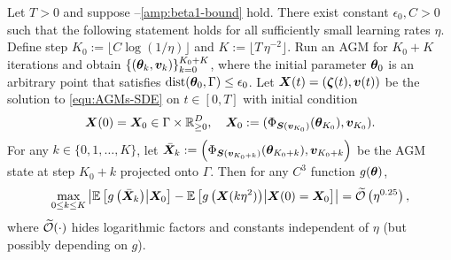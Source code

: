 
\begin{theorem}\label{thm:SDE-approximation}
Let $T>0$ and suppose --\ref{amp:beta1-bound} hold. 
There exist constant $\epsilon_0,C>0$ such that the following statement holds for all sufficiently small learning rates $\eta$.
Define step $K_0 := \lfloor C\log(1/\eta)\rfloor$ and $K := \lfloor T\,\eta^{-2}\rfloor$. 
Run an AGM for $K_0+K$ iterations and obtain $\{({\bm{\theta}}_k, {\bm{v}}_k)\}_{k=0}^{K_0+K}$, where the initial parameter ${\bm{\theta}}_0$ 
is an arbitrary point that satisfies $\mathrm{dist}({\bm{\theta}}_0,\Gamma)\le \epsilon_0$.
Let ${\bm{X}}(t)=({\bm{\zeta}}(t),{\bm{v}}(t))$ be the solution to \eqref{equ:AGMs-SDE} on $t\in[0,T]$ with initial condition 
$${\bm{X}}(0) =
{\bm{X}}_0
\in \Gamma \times \mathbb{R}_{\ge 0}^D, \quad {\bm{X}}_0 := (\Phi_{{\bm{S}}({\bm{v}}_{K_0})}({\bm{\theta}}_{K_0}), {\bm{v}}_{K_0}).
$$
For any $k \in \{0, 1, \dots, K\}$,
let $\bar{{\bm{X}}}_{k} := \left(\Phi_{{\bm{S}}({\bm{v}}_{K_0 + k})}({\bm{\theta}}_{K_0+k}),{\bm{v}}_{K_0+k}\right)$ be the AGM state at step $K_0 + k$ projected onto $\Gamma$.
Then for any $C^3$ function $g({\bm{\theta}})$,
\begin{align*}
\max_{0\le k\le K}
\left|
\mathbb{E}\left[g\left(\bar{{\bm{X}}}_{k}\right)\middle|{\bm{X}}_0\right]
-\mathbb{E}\left[g\left({\bm{X}}(k\eta^2)\right)\middle|{\bm{X}}(0)={\bm{X}}_0\right]\right| 
= \widetilde {\mathcal{O}}\left(\eta^{0.25}\right),
\end{align*}
where $\widetilde {\mathcal{O}}(\cdot)$ hides logarithmic factors and constants independent of $\eta$ (but possibly depending on $g$).
\end{theorem}


